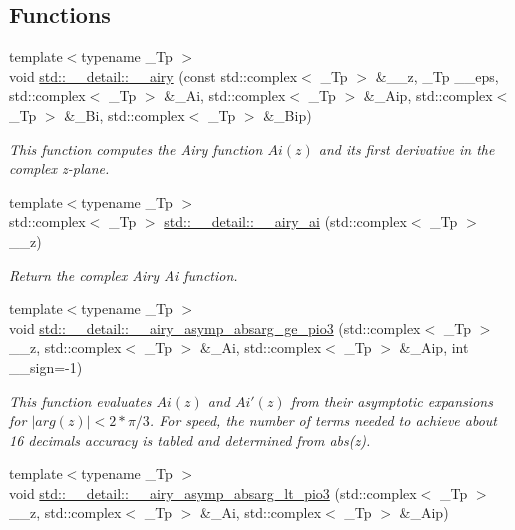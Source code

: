 \subsection*{Functions}
\begin{DoxyCompactItemize}
\item 
{\footnotesize template$<$typename \+\_\+\+Tp $>$ }\\void \hyperlink{namespacestd_1_1____detail_a6817269a446ea93bb50e7438e27c1162}{std\+::\+\_\+\+\_\+detail\+::\+\_\+\+\_\+airy} (const std\+::complex$<$ \+\_\+\+Tp $>$ \&\+\_\+\+\_\+z, \+\_\+\+Tp \+\_\+\+\_\+eps, std\+::complex$<$ \+\_\+\+Tp $>$ \&\+\_\+\+Ai, std\+::complex$<$ \+\_\+\+Tp $>$ \&\+\_\+\+Aip, std\+::complex$<$ \+\_\+\+Tp $>$ \&\+\_\+\+Bi, std\+::complex$<$ \+\_\+\+Tp $>$ \&\+\_\+\+Bip)
\begin{DoxyCompactList}\small\item\em This function computes the Airy function $ Ai(z) $ and its first derivative in the complex z-\/plane. \end{DoxyCompactList}\item 
{\footnotesize template$<$typename \+\_\+\+Tp $>$ }\\std\+::complex$<$ \+\_\+\+Tp $>$ \hyperlink{namespacestd_1_1____detail_afd48b5702344f832a250922ac4ffb917}{std\+::\+\_\+\+\_\+detail\+::\+\_\+\+\_\+airy\+\_\+ai} (std\+::complex$<$ \+\_\+\+Tp $>$ \+\_\+\+\_\+z)
\begin{DoxyCompactList}\small\item\em Return the complex Airy Ai function. \end{DoxyCompactList}\item 
{\footnotesize template$<$typename \+\_\+\+Tp $>$ }\\void \hyperlink{namespacestd_1_1____detail_a026a02e51a93428332a607c093e8204f}{std\+::\+\_\+\+\_\+detail\+::\+\_\+\+\_\+airy\+\_\+asymp\+\_\+absarg\+\_\+ge\+\_\+pio3} (std\+::complex$<$ \+\_\+\+Tp $>$ \+\_\+\+\_\+z, std\+::complex$<$ \+\_\+\+Tp $>$ \&\+\_\+\+Ai, std\+::complex$<$ \+\_\+\+Tp $>$ \&\+\_\+\+Aip, int \+\_\+\+\_\+sign=-\/1)
\begin{DoxyCompactList}\small\item\em This function evaluates $ Ai(z) $ and $ Ai'(z) $ from their asymptotic expansions for $ |arg(z)| < 2*\pi/3 $. For speed, the number of terms needed to achieve about 16 decimals accuracy is tabled and determined from abs(z). \end{DoxyCompactList}\item 
{\footnotesize template$<$typename \+\_\+\+Tp $>$ }\\void \hyperlink{namespacestd_1_1____detail_a4f1c33b398ae69c55281341004da0679}{std\+::\+\_\+\+\_\+detail\+::\+\_\+\+\_\+airy\+\_\+asymp\+\_\+absarg\+\_\+lt\+\_\+pio3} (std\+::complex$<$ \+\_\+\+Tp $>$ \+\_\+\+\_\+z, std\+::complex$<$ \+\_\+\+Tp $>$ \&\+\_\+\+Ai, std\+::complex$<$ \+\_\+\+Tp $>$ \&\+\_\+\+Aip)

\end{DoxyCompactItemize}
